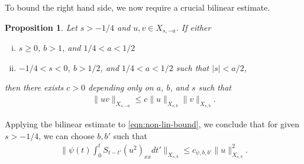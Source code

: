\documentclass[12pt,reqno]{amsart}
\numberwithin{equation}{section}  %
\numberwithin{figure}{section}
\theoremstyle{plain}
\newtheorem{proposition}{Proposition}
\theoremstyle{definition}
\theoremstyle{remark}
\begin{document}
%
%
To bound the right hand side, we now require a crucial bilinear
estimate.
%
%
%
%
%
%
%
%
\begin{proposition}
\label{prop:bilin-est}
  Let $s > -1/4$ and $u,v \in X_{s, -a}$. If either
  \begin{enumerate}[(i)]
   \item{$s \ge 0$, $b > 1$, and $1/4 < a< 1/2$ }
     \label{first-it}
   \item{ $-1/4 < s< 0$, $b > 1/2$, and $1/4 < a < 1/2$ such that $| s | <
     a/2$,}
     \label{sec-item}
  \end{enumerate}
 then there exists $c > 0$ depending only on $a$, $b$, and $s$ such that
  \begin{equation*}
  \begin{split}
    \| uv \|_{X_{s,-a}} \le c \| u \|_{X_{s,b}} \| v \|_{X_{s,b}}.
  \end{split}
  \end{equation*}
\end{proposition}
%
%
Applying the bilinear estimate to \eqref{eqn:non-lin-bound}, we conclude that
for given $s > -1/4$, we can choose $b, b'$ such that
%
%
\begin{equation}
\begin{split}
\|\psi(t) \int_{0}^{t} S_{t-t'} (u^{2})_{xx} dt'\|_{X_{s,b}} \le c_{\psi, b,
  b'} \| u \|^2_{X_{s,b}}.
\end{split}
\label{eqn:nonlinear-term-bound}
\end{equation}
%
%
\end{document}
